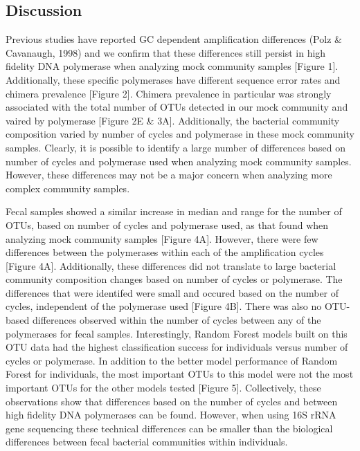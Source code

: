\documentclass[11pt,]{article}
\begin{document}
\newpage

\subsection{Discussion}\label{discussion}

Previous studies have reported GC dependent amplification differences
(Polz \& Cavanaugh, 1998) and we confirm that these differences still
persist in high fidelity DNA polymerase when analyzing mock community
samples {[}Figure 1{]}. Additionally, these specific polymerases have
different sequence error rates and chimera prevalence {[}Figure 2{]}.
Chimera prevalence in particular was strongly associated with the total
number of OTUs detected in our mock community and vaired by polymerase
{[}Figure 2E \& 3A{]}. Additionally, the bacterial community composition
varied by number of cycles and polymerase in these mock community
samples. Clearly, it is possible to identify a large number of
differences based on number of cycles and polymerase used when analyzing
mock community samples. However, these differences may not be a major
concern when analyzing more complex community samples.

Fecal samples showed a similar increase in median and range for the
number of OTUs, based on number of cycles and polymerase used, as that
found when analyzing mock community samples {[}Figure 4A{]}. However,
there were few differences between the polymerases within each of the
amplification cycles {[}Figure 4A{]}. Additionally, these differences
did not translate to large bacterial community composition changes based
on number of cycles or polymerase. The differences that were identifed
were small and occured based on the number of cycles, independent of the
polymerase used {[}Figure 4B{]}. There was also no OTU-based differences
observed within the number of cycles between any of the polymerases for
fecal samples. Interestingly, Random Forest models built on this OTU
data had the highest classification success for individuals versus
number of cycles or polymerase. In addition to the better model
performance of Random Forest for individuals, the most important OTUs to
this model were not the most important OTUs for the other models tested
{[}Figure 5{]}. Collectively, these observations show that differences
based on the number of cycles and between high fidelity DNA polymerases
can be found. However, when using 16S rRNA gene sequencing these
technical differences can be smaller than the biological differences
between fecal bacterial communities within individuals.
\end{document}
